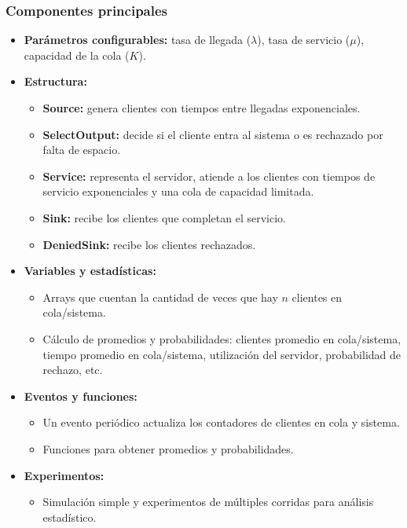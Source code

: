 \documentclass{article}
\begin{document}
\subsubsection*{Componentes principales}
\begin{itemize}
    \item \textbf{Parámetros configurables:} tasa de llegada ($\lambda$), tasa de servicio ($\mu$), capacidad de la cola ($K$).
    \item \textbf{Estructura:}
    \begin{itemize}
        \item \textbf{Source:} genera clientes con tiempos entre llegadas exponenciales.
        \item \textbf{SelectOutput:} decide si el cliente entra al sistema o es rechazado por falta de espacio.
        \item \textbf{Service:} representa el servidor, atiende a los clientes con tiempos de servicio exponenciales y una cola de capacidad limitada.
        \item \textbf{Sink:} recibe los clientes que completan el servicio.
        \item \textbf{DeniedSink:} recibe los clientes rechazados.
    \end{itemize}
    \item \textbf{Variables y estadísticas:}
    \begin{itemize}
        \item Arrays que cuentan la cantidad de veces que hay $n$ clientes en cola/sistema.
        \item Cálculo de promedios y probabilidades: clientes promedio en cola/sistema, tiempo promedio en cola/sistema, utilización del servidor, probabilidad de rechazo, etc.
    \end{itemize}
    \item \textbf{Eventos y funciones:}
    \begin{itemize}
        \item Un evento periódico actualiza los contadores de clientes en cola y sistema.
        \item Funciones para obtener promedios y probabilidades.
    \end{itemize}
    \item \textbf{Experimentos:}
    \begin{itemize}
        \item Simulación simple y experimentos de múltiples corridas para análisis estadístico.
    \end{itemize}
\end{itemize}
\end{document}
